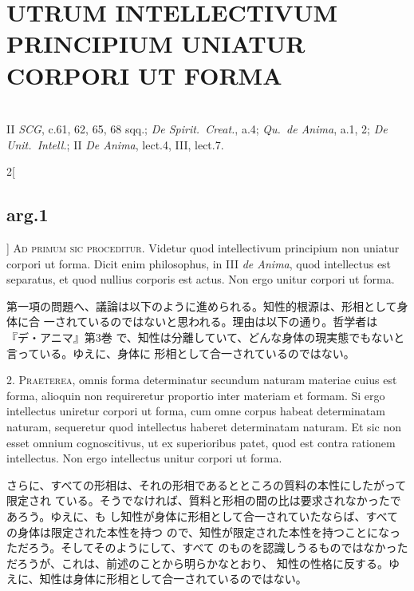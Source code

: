 \documentclass[paper=a4paper,fontsize=10pt,jafontsize=9pt,titlepage]{jlreq}
\begin{document}
 \section{UTRUM INTELLECTIVUM PRINCIPIUM UNIATUR CORPORI UT FORMA}
 \vspace{1em}
 \\
 \vspace{1em} 
{\footnotesize II {\itshape SCG}, c.61, 62, 65, 68 sqq.; {\itshape De Spirit.~Creat.}, a.4; {\itshape Qu.~de Anima}, a.1, 2; {\itshape De Unit.~Intell.}; II {\itshape De Anima}, lect.4, III, lect.7.}\\


\begin{paracol}{2}[\subsection{arg.1}]
{\scshape Ad primum sic proceditur}. Videtur quod intellectivum principium non
uniatur corpori ut forma. Dicit enim philosophus, in III {\itshape de Anima},
quod intellectus est separatus, et quod nullius corporis est actus. Non ergo
unitur corpori ut forma.
 
\switchcolumn

 第一項の問題へ、議論は以下のように進められる。知性的根源は、形相として身体に合
 一されているのではないと思われる。理由は以下の通り。哲学者は『デ・アニマ』第3巻
 で、知性は分離していて、どんな身体の現実態でもないと言っている。ゆえに、身体に
 形相として合一されているのではない。
 

2. {\scshape Praeterea}, omnis forma determinatur secundum naturam materiae
cuius est forma, alioquin non requireretur proportio inter materiam et
formam. Si ergo intellectus uniretur corpori ut forma, cum omne corpus habeat
determinatam naturam, sequeretur quod intellectus haberet determinatam
naturam. Et sic non esset omnium cognoscitivus, ut ex superioribus patet, quod
est contra rationem intellectus. Non ergo intellectus unitur corpori ut forma.
 
\switchcolumn

さらに、すべての形相は、それの形相であるとところの質料の本性にしたがって限定され
ている。そうでなければ、質料と形相の間の比は要求されなかったであろう。ゆえに、も
し知性が身体に形相として合一されていたならば、すべての身体は限定された本性を持つ
ので、知性が限定された本性を持つことになっただろう。そしてそのようにして、すべて
のものを認識しうるものではなかっただろうが、これは、前述のことから明らかなとおり、
知性の性格に反する。ゆえに、知性は身体に形相として合一されているのではない。
 

\end{paracol}
\end{document}
